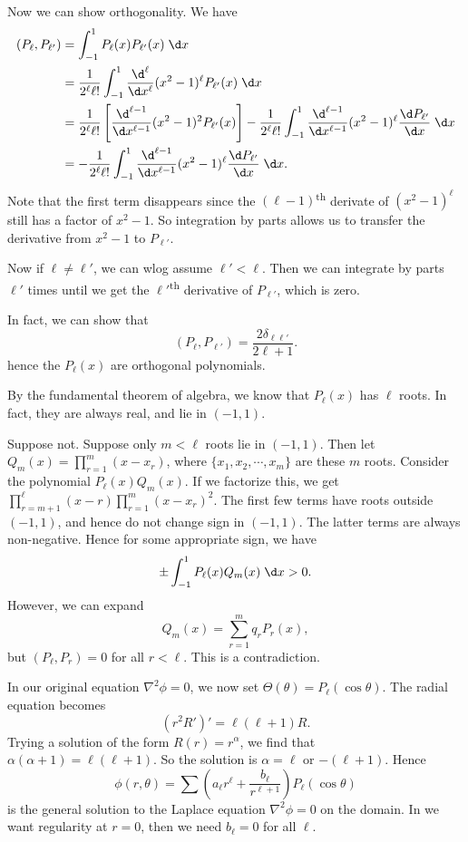\documentclass[a4paper]{article}
\begin{document}
Now we can show orthogonality. We have
\begin{align*}
  (P_\ell, P_{\ell'}) &= \int_{-1}^1 P_\ell(x) P_{\ell'}(x) \;\d x\\
  &= \frac{1}{2^\ell \ell!}\int_{-1}^1 \frac{\d^\ell}{\d x^\ell} (x^2 - 1)^\ell P_{\ell'}(x)\;\d x\\
  &= \frac{1}{2^\ell \ell!}\left[\frac{\d^{\ell - 1}}{\d x^{\ell - 1}} (x^2 - 1)^2 P_{\ell'}(x)\right]  - \frac{1}{2^\ell \ell!} \int_{-1}^1 \frac{\d^{\ell - 1}}{\d x^{\ell - 1}}(x^2 - 1)^\ell \frac{\d P_{\ell'}}{\d x}\;\d x\\
  &= - \frac{1}{2^\ell \ell!} \int_{-1}^1 \frac{\d^{\ell - 1}}{\d x^{\ell - 1}}(x^2 - 1)^\ell \frac{\d P_{\ell'}}{\d x}\;\d x.
\end{align*}
Note that the first term disappears since the $(\ell - 1)$\textsuperscript{th} derivate of $(x^2 - 1)^\ell$ still has a factor of $x^2 - 1$. So integration by parts allows us to transfer the derivative from $x^2 - 1$ to $P_{\ell'}$.

Now if $\ell \not= \ell'$, we can wlog assume $\ell' < \ell$. Then we can integrate by parts $\ell'$ times until we get the $\ell'$\textsuperscript{th} derivative of $P_{\ell'}$, which is zero.

In fact, we can show that
\[
  (P_\ell, P_{\ell'}) = \frac{2\delta_{\ell\ell'}}{2\ell + 1}.
\]
hence the $P_\ell(x)$ are orthogonal polynomials.

By the fundamental theorem of algebra, we know that $P_\ell(x)$ has $\ell$ roots. In fact, they are always real, and lie in $(-1, 1)$.

Suppose not. Suppose only $m < \ell$ roots lie in $(-1, 1)$. Then let $Q_m(x) = \prod_{r = 1}^m (x - x_r)$, where $\{x_1, x_2, \cdots, x_m\}$ are these $m$ roots. Consider the polynomial $P_{\ell}(x)Q_m(x)$. If we factorize this, we get $\prod_{r = m + 1}^\ell (x - r)\prod_{r = 1}^m (x - x_r)^2$. The first few terms have roots outside $(-1, 1)$, and hence do not change sign in $(-1, 1)$. The latter terms are always non-negative. Hence for some appropriate sign, we have
\[
  \pm\int_{-1}^1 P_\ell(x) Q_m(x) \;\d x > 0.
\]
However, we can expand
\[
  Q_m(x) = \sum_{r = 1}^m q_r P_r(x),
\]
but $(P_\ell, P_r) = 0$ for all $r < \ell$. This is a contradiction.

In our original equation $\nabla^2 \phi = 0$, we now set $\Theta(\theta) = P_\ell(\cos \theta)$. The radial equation becomes
\[
  (r^2 R')' = \ell(\ell + 1)R.
\]
Trying a solution of the form $R(r) = r^\alpha$, we find that $\alpha(\alpha + 1) = \ell(\ell + 1)$. So the solution is $\alpha = \ell$ or $-(\ell + 1)$. Hence
\[
  \phi(r, \theta) = \sum \left(a_\ell r^\ell + \frac{b_\ell}{r^{\ell + 1}}\right) P_\ell(\cos \theta)
\]
is the general solution to the Laplace equation $\nabla^2 \phi = 0$ on the domain. In we want regularity at $r = 0$, then we need $b_\ell = 0$ for all $\ell$.
\end{document}
